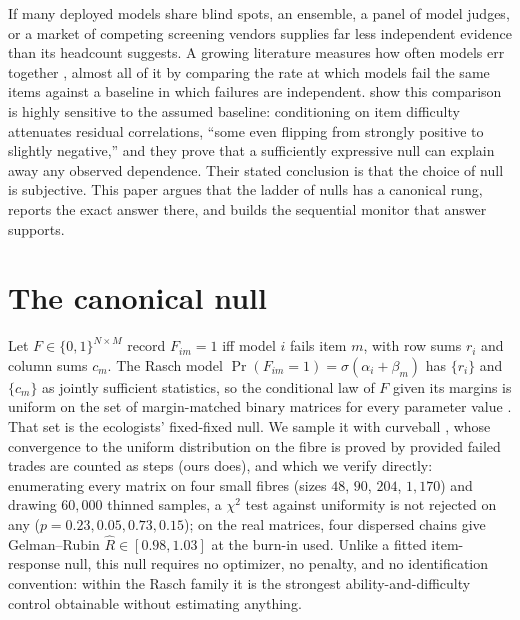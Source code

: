 \documentclass{article}
\begin{document}
If many deployed models share blind spots, an ensemble, a panel of model judges, or a market of
competing screening vendors supplies far less independent evidence than its headcount suggests.
A growing literature measures how often models err together \citep{kim2025}, almost all of it
by comparing the rate at which models fail the same items against a baseline in which failures
are independent. \citet{jo2026} show this comparison is highly sensitive to the
assumed baseline: conditioning on item difficulty attenuates residual correlations, ``some even
flipping from strongly positive to slightly negative,'' and they prove that a sufficiently
expressive null can explain away any observed dependence. Their stated conclusion is that the
choice of null is subjective. This paper argues that the ladder of nulls has a canonical rung, reports the exact answer there,
and builds the sequential monitor that answer supports.

\section{The canonical null}

Let $F \in \{0,1\}^{N\times M}$ record $F_{im}=1$ iff model $i$ fails item $m$, with row sums
$r_i$ and column sums $c_m$. The Rasch model $\Pr(F_{im}=1)=\sigma(\alpha_i+\beta_m)$ has
$\{r_i\}$ and $\{c_m\}$ as jointly sufficient statistics, so the conditional law of $F$ given its
margins is uniform on the set of margin-matched binary matrices for every parameter value
\citep{rasch1960,andersen1973}. That set is the ecologists' fixed-fixed null. We sample it with
curveball \citep{strona2014}, whose convergence to the uniform distribution on the fibre is proved
by \citet{carstens2015} provided failed trades are counted as steps (ours does), and which we
verify directly: enumerating every matrix on four small fibres (sizes $48$, $90$, $204$, $1{,}170$)
and drawing $60{,}000$ thinned samples, a $\chi^2$ test against uniformity is not rejected on any
($p=0.23, 0.05, 0.73, 0.15$); on the real matrices, four dispersed chains give Gelman--Rubin
$\hat R\in[0.98,1.03]$ at the burn-in used. Unlike a fitted item-response null, this null requires
no optimizer, no penalty, and no identification convention: within the Rasch family it is the
strongest ability-and-difficulty control obtainable without estimating anything.
\end{document}
